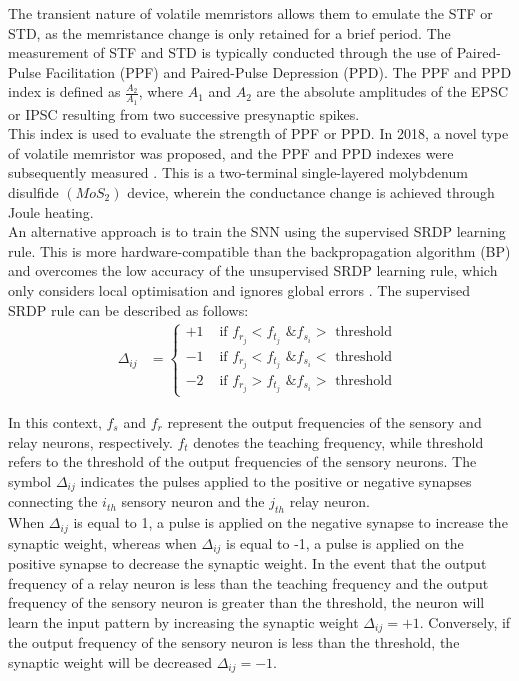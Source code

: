 \noindent The transient nature of volatile memristors allows them to emulate the STF or STD, as the memristance change is only retained for a brief period. The measurement of STF and STD is typically conducted through the use of Paired-Pulse Facilitation (PPF) and Paired-Pulse Depression (PPD). The PPF and PPD index is defined as $\frac{A_2}{A_1}$, where $A_1$ and $A_2$ are the absolute amplitudes of the EPSC or IPSC resulting from two successive presynaptic spikes. \\

\noindent This index is used to evaluate the strength of PPF or PPD. In 2018, a novel type of volatile memristor was proposed, and the PPF and PPD indexes were subsequently measured \cite{sun2018synaptic}. This is a two-terminal single-layered molybdenum disulfide $(MoS_2)$ device, wherein the conductance change is achieved through Joule heating. \\

\noindent An alternative approach is to train the SNN using the supervised SRDP learning rule. This is more hardware-compatible than the backpropagation algorithm (BP) and overcomes the low accuracy of the unsupervised SRDP learning rule, which only considers local optimisation and ignores global errors \cite{pfeiffer2018deep}. The supervised SRDP rule can be described as follows:
\begin{align}
\Delta_{ij} &= \begin{cases}
+1 & \text{ if } f_{r_j} < f_{t_j} \text{ \& } f_{s_i} > \text{ threshold }\\ 
-1 & \text{ if } f_{r_j} < f_{t_j} \text{ \& } f_{s_i} < \text{ threshold } \\
-2 & \text{ if } f_{r_j} > f_{t_j} \text{ \& } f_{s_i} > \text{ threshold }
\end{cases} \label{eq:6.12}
\end{align}

\noindent In this context, $f_s$ and $f_r$ represent the output frequencies of the sensory and relay neurons, respectively. $f_t$ denotes the teaching frequency, while threshold refers to the threshold of the output frequencies of the sensory neurons. The symbol $\Delta_{ij}$ indicates the pulses applied to the positive or negative synapses connecting the $i_{th}$ sensory neuron and the $j_{th}$ relay neuron. \\

\noindent When $\Delta_{ij}$ is equal to 1, a pulse is applied on the negative synapse to increase the synaptic weight, whereas when $\Delta_{ij}$ is equal to -1, a pulse is applied on the positive synapse to decrease the synaptic weight. In the event that the output frequency of a relay neuron is less than the teaching frequency and the output frequency of the sensory neuron is greater than the threshold, the neuron will learn the input pattern by increasing the synaptic weight $\Delta_{ij} = +1$. Conversely, if the output frequency of the sensory neuron is less than the threshold, the synaptic weight will be decreased $\Delta_{ij} = -1$. \\

